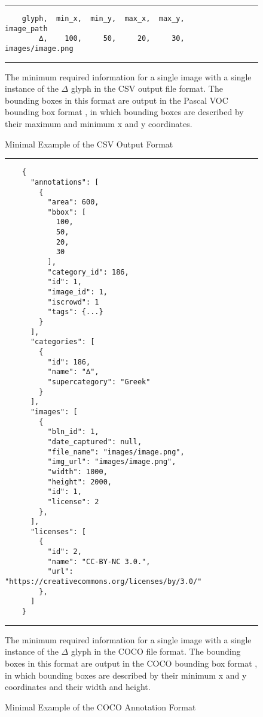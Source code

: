 \begin{figure}
  \caption{Minimal Example of the CSV Output Format}
  \label{fig:csv_output}
  \par\noindent\rule{\textwidth}{0.5pt}
  \begin{\codefigsize}
  \begin{lstlisting}
    glyph,  min_x,  min_y,  max_x,  max_y,        image_path
        ∆,    100,     50,     20,     30,  images/image.png
  \end{lstlisting}
  \end{\codefigsize}
  \par\noindent\rule{\textwidth}{0.5pt}
  The minimum required information for a single image with a single instance of the $\Delta$ glyph in the CSV output file format. The bounding boxes in this format are output in the Pascal VOC bounding box format , in which bounding boxes are described by their maximum and minimum x and y coordinates.
\end{figure}

\begin{figure}
  \caption{Minimal Example of the COCO Annotation Format}
  \label{fig:coco}
  \par\noindent\rule{\textwidth}{0.5pt}
  \begin{\codefigsize}
  \begin{lstlisting}
    {
      "annotations": [
        {
          "area": 600,
          "bbox": [
            100,
            50,
            20,
            30
          ],
          "category_id": 186,
          "id": 1,
          "image_id": 1,
          "iscrowd": 1
          "tags": {...}
        }
      ],
      "categories": [
        {
          "id": 186,
          "name": "∆",
          "supercategory": "Greek"
        }
      ],
      "images": [
        {
          "bln_id": 1,
          "date_captured": null,
          "file_name": "images/image.png",
          "img_url": "images/image.png",
          "width": 1000,
          "height": 2000,
          "id": 1,
          "license": 2
        },
      ],
      "licenses": [
        {
          "id": 2,
          "name": "CC-BY-NC 3.0.",
          "url": "https://creativecommons.org/licenses/by/3.0/"
        },
      ]
    }
  \end{lstlisting}
  \end{\codefigsize}
  \par\noindent\rule{\textwidth}{0.5pt}
  The minimum required information for a single image with a single instance of the $\Delta$ glyph in the COCO file format. The bounding boxes in this format are output in the COCO bounding box format , in which bounding boxes are described by their minimum x and y coordinates and their width and height.
\end{figure}
